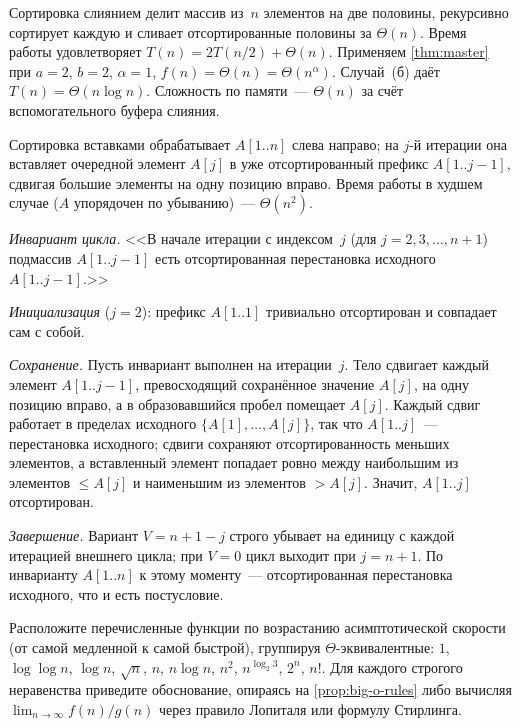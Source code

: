 \begin{example}
\label{ex:mergesort}
Сортировка слиянием делит массив из~$n$ элементов на две половины,
рекурсивно сортирует каждую и сливает отсортированные половины за
$\Theta(n)$. Время работы удовлетворяет
$T(n) = 2 T(n/2) + \Theta(n)$. Применяем \cref{thm:master} при
$a = 2$, $b = 2$, $\alpha = 1$, $f(n) = \Theta(n) = \Theta(n^\alpha)$.
Случай~(б) даёт $T(n) = \Theta(n \log n)$. Сложность по памяти~---
$\Theta(n)$ за счёт вспомогательного буфера слияния.
\end{example}

\begin{example}
\label{ex:insertion-sort}
Сортировка вставками обрабатывает $A[1..n]$ слева направо; на $j$-й
итерации она вставляет очередной элемент $A[j]$ в уже отсортированный
префикс $A[1..j-1]$, сдвигая большие элементы на одну позицию вправо.
Время работы в худшем случае ($A$ упорядочен по убыванию)~---
$\Theta(n^2)$.

\emph{Инвариант цикла.} <<В начале итерации с индексом~$j$ (для
$j = 2, 3, \dots, n + 1$) подмассив $A[1..j-1]$ есть отсортированная
перестановка исходного $A[1..j-1]$.>>

\emph{Инициализация} ($j = 2$): префикс $A[1..1]$ тривиально
отсортирован и совпадает сам с собой.

\emph{Сохранение.} Пусть инвариант выполнен на итерации~$j$. Тело
сдвигает каждый элемент $A[1..j-1]$, превосходящий сохранённое
значение $A[j]$, на одну позицию вправо, а в образовавшийся пробел
помещает $A[j]$. Каждый сдвиг работает в пределах исходного
$\{A[1], \dots, A[j]\}$, так что $A[1..j]$~--- перестановка
исходного; сдвиги сохраняют отсортированность меньших элементов, а
вставленный элемент попадает ровно между наибольшим из элементов
$\leq A[j]$ и наименьшим из элементов $> A[j]$. Значит, $A[1..j]$
отсортирован.

\emph{Завершение.} Вариант $V = n + 1 - j$ строго убывает на
единицу с каждой итерацией внешнего цикла; при $V = 0$ цикл
выходит при $j = n + 1$. По инварианту $A[1..n]$ к этому моменту~---
отсортированная перестановка исходного, что и есть постусловие.
\end{example}

\begin{problem}
\label{prob:growth-hierarchy}
Расположите перечисленные функции по возрастанию асимптотической
скорости (от самой медленной к самой быстрой), группируя
$\Theta$-эквивалентные:
$1$, $\log\log n$, $\log n$, $\sqrt{n}$, $n$, $n \log n$, $n^2$,
$n^{\log_2 3}$, $2^n$, $n!$. Для каждого строгого неравенства приведите
обоснование, опираясь на \cref{prop:big-o-rules} либо вычисляя
$\lim_{n \to \infty} f(n)/g(n)$ через правило Лопиталя или формулу
Стирлинга.
\end{problem}

